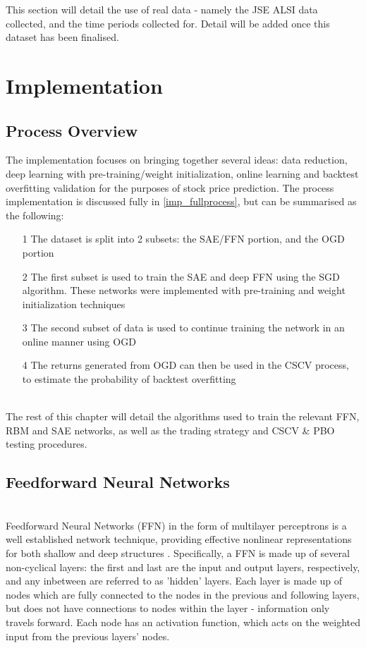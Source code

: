 \documentclass[a4paper,latin]{paper}
\begin{document}
This section will detail the use of real data - namely the JSE ALSI data collected, and the time periods collected for. Detail will be added once this dataset has been finalised. 

\newpage
\section{Implementation}\label{Implementation}
\subsection{Process Overview}\label{ProcessOverview}\label{imp_overview}


The implementation focuses on bringing together several ideas: data reduction, deep learning with pre-training/weight initialization, online learning and backtest overfitting validation for the purposes of stock price prediction. The process implementation is discussed fully in \ref{imp_fullprocess}, but can be summarised as the following:

\begin{itemize}
	\item [1] The dataset is split into 2 subsets: the SAE/FFN  portion, and the OGD portion
	\item [2] The first subset is used to train the SAE and deep FFN using the SGD algorithm. These networks were implemented with pre-training and weight initialization techniques
	\item [3] The second subset of data is used to continue training the network in an online manner using OGD
	\item [4] The returns generated from OGD can then be used in the CSCV process, to estimate the probability of backtest overfitting
\end{itemize}
~\\
The rest of this chapter will detail the algorithms used to train the relevant FFN, RBM and SAE networks, as well as the trading strategy and CSCV \& PBO testing procedures.

\subsection{Feedforward Neural Networks}\label{imp_ffn}
~\\
Feedforward Neural Networks (FFN) in the form of multilayer perceptrons is a well established network technique, providing effective nonlinear representations for both shallow and deep structures \cite{Schmidhuber}. Specifically, a FFN is made up of several non-cyclical layers: the first and last are the input and output layers, respectively, and any inbetween are referred to as 'hidden' layers. Each layer is made up of nodes which are fully connected to the nodes in the previous and following layers, but does not have connections to nodes within the layer - information only travels forward. Each 
node has an activation function, which acts on the weighted input from the previous layers' nodes.
\end{document}
